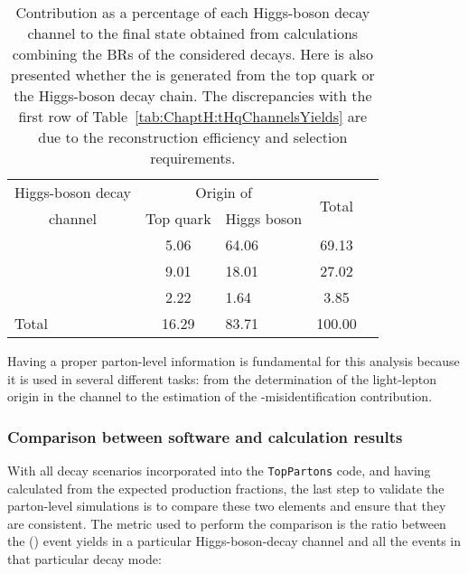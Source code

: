 \begin{table}[h]
\centering
\begin{tabular}{lclc|c}
\toprule
       \multicolumn{1}{c|}{Higgs-boson decay} 	& \multicolumn{2}{c|}{Origin of \tauhad} &    \multirow{2}{*}{Total}     \\ \cline{2-3}
      \multicolumn{1}{c|}{channel}  		& Top quark        				& Higgs boson       &   \\ \midrule
\Htautau 	& 5.06      					& 64.06        		      			& 69.13	\\
\HWW    	& 9.01         				& 18.01              				& 27.02 	\\
\HZZ    	& 2.22          				& 1.64               				& 3.85   	\\ 
\midrule
Total  	& 16.29           				& 83.71              				& 100.00 	\\
\bottomrule
\end{tabular}
\caption{Contribution as a percentage of each Higgs-boson decay channel to the \dileptau final state obtained
from calculations combining the BRs of the considered decays.
Here is also presented whether the \tauhad is generated from the top quark or the Higgs-boson decay chain.
The discrepancies with the first row of Table~\ref{tab:ChaptH:tHqChannelsYields} are due to the reconstruction efficiency 
and selection requirements.}
\label{tab:ChaptH:TruthSummary}
\end{table}



Having a proper parton-level information is fundamental for this analysis because it is
used in several different tasks: from the determination of the light-lepton origin in
the \dilepSStau channel to the estimation of the \tauhad-misidentification contribution. 

\subsubsection{Comparison between software and calculation results}
With all decay scenarios incorporated into the \texttt{TopPartons} code, and having
calculated from the expected production fractions, the last step to validate the
parton-level simulations is to compare these two elements and ensure that
they are consistent.
The metric used to perform the comparison is the ratio between the \tHq(\dileptau) event yields
 in a particular Higgs-boson-decay channel and all the events in that particular decay mode:  %

